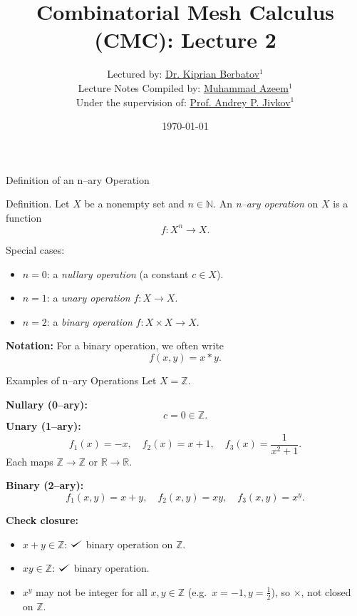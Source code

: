 \documentclass[11pt,aspectratio=43,ignorenonframetext,t]{beamer}
\title{Combinatorial Mesh Calculus (CMC): Lecture 2}
\author{Lectured by: \href{https://scholar.google.com/citations?user=x4R-snQAAAAJ&hl=en}{Dr. Kiprian Berbatov}$^1$\\
\smallskip
Lecture Notes Compiled by: \href{https://scholar.google.com/citations?user=CoIpITkAAAAJ&hl=en}{Muhammad Azeem}$^1$\\
\smallskip
Under the supervision of: \href{https://scholar.google.co.uk/citations?user=3nWJe5wAAAAJ&hl=en}{Prof. Andrey P. Jivkov}$^1$\\
\smallskip {\tiny $^1$Department of Mechanical and Aerospace Engineering, The University of Manchester, Oxford Road, Manchester M13 9PL, UK}
}
\date{\today}
\def\checkmark{\tikz\fill[scale=0.4](0,.35) -- (.25,0) -- (1,.7) -- (.25,.15) -- cycle;}
\begin{document}
\begin{frame}
  \titlepage
\end{frame}


\begin{frame}{Definition of an n–ary Operation}
\begin{block}{Definition.}  
Let \( X \) be a nonempty set and \( n \in \mathbb{N} \).  
An \emph{n–ary operation} on \( X \) is a function
\[
f : X^n \longrightarrow X.
\]  
\end{block}

\begin{block}{Special cases:}
\begin{itemize}
  \item \( n = 0 \): a \emph{nullary operation} (a constant \( c \in X \)).
  \item \( n = 1 \): a \emph{unary operation} \( f: X \to X \).
  \item \( n = 2 \): a \emph{binary operation} \( f: X \times X \to X \).
\end{itemize}

\textbf{Notation:} For a binary operation, we often write  
\[
f(x,y) = x * y.
\]
    
\end{block}
\end{frame}

\begin{frame}{Examples of n–ary Operations}
\vspace{-0.3cm}
Let \( X = \mathbb{Z} \).

\textbf{Nullary (0–ary):}
\[
c = 0 \in \mathbb{Z}.
\]
\textbf{Unary (1–ary):}
\[
f_1(x) = -x, \quad f_2(x) = x + 1, \quad f_3(x) = \frac{1}{x^2 + 1}.
\]
Each maps \( \mathbb{Z} \to \mathbb{Z} \) or \( \mathbb{R} \to \mathbb{R} \).

\textbf{Binary (2–ary):}
\[
f_1(x,y) = x + y, \quad f_2(x,y) = xy, \quad f_3(x,y) = x^y.
\]

\textbf{Check closure:}
\begin{itemize}
  \item \(x+y \in \mathbb{Z}\): $\checkmark$ binary operation on \(\mathbb{Z}\).
  \item \(xy \in \mathbb{Z}\): $\checkmark$ binary operation.
  \item \(x^y\) may not be integer for all \(x,y\in\mathbb{Z}\) (e.g.\ \(x=-1, y=\frac12\)), so $\times$, not closed on \(\mathbb{Z}\).
\end{itemize}
\end{frame}
\end{document}
